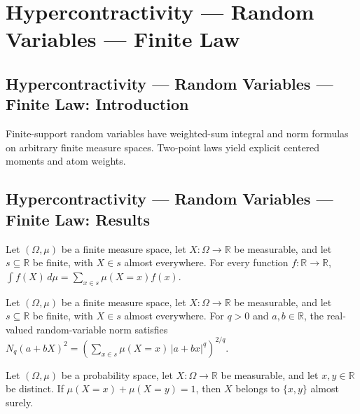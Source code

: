 \section{Hypercontractivity --- Random Variables --- Finite Law}
\subsection*{Hypercontractivity --- Random Variables --- Finite Law: Introduction}
Finite-support random variables have weighted-sum integral and norm formulas on arbitrary finite measure spaces. Two-point laws yield explicit centered moments and atom weights.

\subsection*{Hypercontractivity --- Random Variables --- Finite Law: Results}

\begin{theorem}
\leanok
{}
Let $(\Omega,\mu)$ be a finite measure space, let $X:\Omega\to\mathbb R$ be measurable,
and let $s\subseteq\mathbb R$ be finite, with $X\in s$ almost everywhere. For every
function $f:\mathbb R\to\mathbb R$, $\int f(X)\,d\mu=\sum_{x\in s}\mu(X=x)f(x)$.
\end{theorem}

\begin{theorem}
\leanok
{}
Let $(\Omega,\mu)$ be a finite measure space, let $X:\Omega\to\mathbb R$ be measurable,
and let $s\subseteq\mathbb R$ be finite, with $X\in s$ almost everywhere. For $q>0$ and
$a,b\in\mathbb R$, the real-valued random-variable norm satisfies
$N_q(a+bX)^2=\left(\sum_{x\in s}\mu(X=x)\,|a+bx|^q\right)^{2/q}$.
\end{theorem}

\begin{theorem}
\leanok
{}
Let $(\Omega,\mu)$ be a probability space, let $X:\Omega\to\mathbb R$ be measurable, and
let $x,y\in\mathbb R$ be distinct. If $\mu(X=x)+\mu(X=y)=1$, then $X$ belongs to
$\{x,y\}$ almost surely.
\end{theorem}

